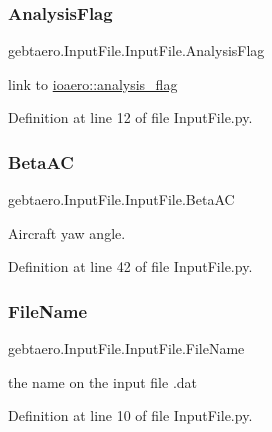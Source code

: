 \subsubsection{\texorpdfstring{Analysis\+Flag}{AnalysisFlag}}
{\footnotesize\ttfamily gebtaero.\+Input\+File.\+Input\+File.\+Analysis\+Flag}



link to \hyperlink{namespaceioaero_a435527b09d62e7aac9883e1a6d6f3438}{ioaero\+::analysis\+\_\+flag} 



Definition at line 12 of file Input\+File.\+py.

\mbox{\label{classgebtaero_1_1_input_file_1_1_input_file_a20868cef3eeb8d6c140d62d2d2252657}} 
\subsubsection{\texorpdfstring{Beta\+AC}{BetaAC}}
{\footnotesize\ttfamily gebtaero.\+Input\+File.\+Input\+File.\+Beta\+AC}



Aircraft yaw angle. 



Definition at line 42 of file Input\+File.\+py.

\mbox{\label{classgebtaero_1_1_input_file_1_1_input_file_a3bb9731a3c44faaf460cb16078183f92}} 
\subsubsection{\texorpdfstring{File\+Name}{FileName}}
{\footnotesize\ttfamily gebtaero.\+Input\+File.\+Input\+File.\+File\+Name}



the name on the input file .dat 



Definition at line 10 of file Input\+File.\+py.


